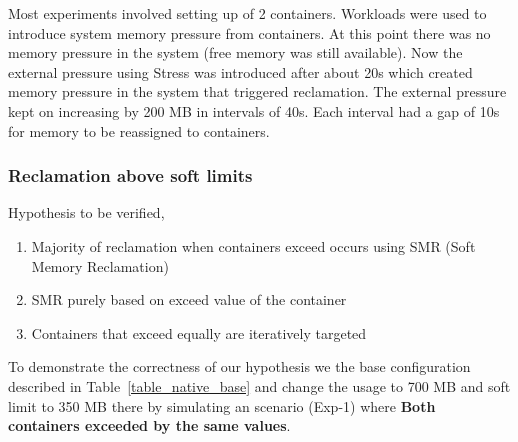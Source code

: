       Most experiments involved setting up of 2 containers. Workloads were used to introduce system memory pressure from containers. At 
      this point there was no memory pressure in the system (free memory was still available). Now the external pressure using Stress was 
      introduced after about 20s which created memory pressure in the system that triggered reclamation. The external pressure kept on increasing 
      by 200 MB in intervals of 40s. Each interval had a gap of 10s for memory to be reassigned to containers.
      
      \subsubsection{Reclamation above soft limits}
      
	  Hypothesis to be verified,
	  \begin{enumerate}
	    \item Majority of reclamation when containers exceed occurs using SMR (Soft Memory Reclamation) 
	    \item SMR purely based on exceed value of the container
	    \item Containers that exceed equally are iteratively targeted
	  \end{enumerate} 
	  
	    To demonstrate the correctness of our hypothesis we the base configuration described in Table~\ref{table_native_base} and change 
  the usage to 700 MB and soft limit to 350 MB there by simulating an scenario (Exp-1) where \textbf{Both containers exceeded by the same 
  values}.
	  
